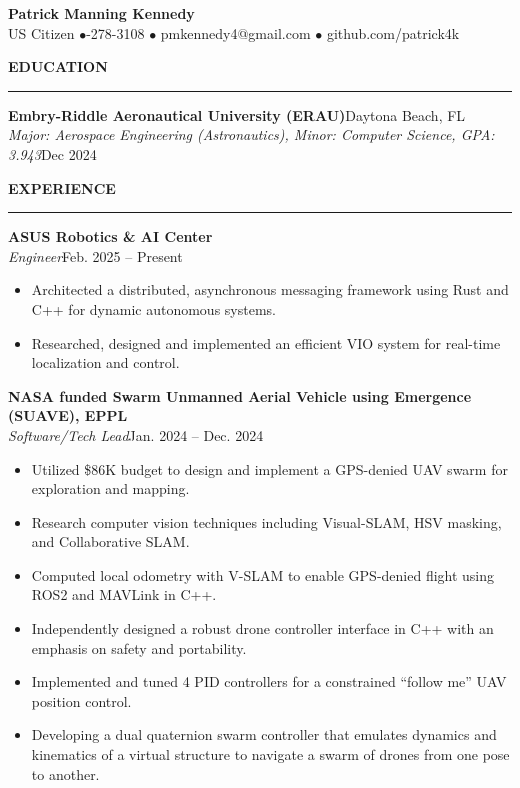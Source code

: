 \documentclass[10pt, letterpaper]{article}
\newcommand{\ressection}[1]{%
    \vspace{10pt}%
    {\large\bfseries\MakeUppercase{#1}}%
    \vspace{2pt}%
    \hrule%
    \vspace{6pt}%
}
\newcommand{\resumeentry}[4]{%
    \textbf{#1}\hfill #2\\%
    \textit{#3}\hfill #4%
}
\begin{document}
\begin{center}
    {\LARGE\bfseries Patrick Manning Kennedy}\\[4pt]
    US Citizen \quad$\bullet$-278-3108 \quad$\bullet$\quad
    pmkennedy4@gmail.com \quad$\bullet$\quad
    github.com/patrick4k
\end{center}

\ressection{Education}
\resumeentry{Embry-Riddle Aeronautical University (ERAU)}{Daytona Beach, FL}{Major: Aerospace Engineering (Astronautics), Minor: Computer Science, GPA: 3.943}{Dec 2024}

\ressection{Experience}

\vspace{4pt}
\resumeentry{ASUS Robotics \& AI Center}{}{Engineer}{Feb. 2025 -- Present}
\vspace{-6pt}
\begin{itemize}
    \setlength{\itemsep}{0pt}
    \setlength{\parskip}{0pt}
    \setlength{\topsep}{0pt}
    \item Architected a distributed, asynchronous messaging framework using Rust and C++ for dynamic autonomous systems.
    \item Researched, designed and implemented an efficient VIO system for real-time localization and control.
\end{itemize}


\resumeentry{NASA funded Swarm Unmanned Aerial Vehicle using Emergence (SUAVE), EPPL}{}{Software/Tech Lead}{Jan. 2024 -- Dec. 2024}
\vspace{-6pt}
\begin{itemize}
    \setlength{\itemsep}{0pt}
    \setlength{\parskip}{0pt}
    \setlength{\topsep}{0pt}
    \item Utilized \$86K budget to design and implement a GPS-denied UAV swarm for exploration and mapping.
    \item Research computer vision techniques including Visual-SLAM, HSV masking, and Collaborative SLAM.
    \item Computed local odometry with V-SLAM to enable GPS-denied flight using ROS2 and MAVLink in C++.
    \item Independently designed a robust drone controller interface in C++ with an emphasis on safety and portability.
    \item Implemented and tuned 4 PID controllers for a constrained ``follow me'' UAV position control.
    \item Developing a dual quaternion swarm controller that emulates dynamics and kinematics of a virtual structure to navigate a swarm of drones from one pose to another.
\end{itemize}
\end{document}

